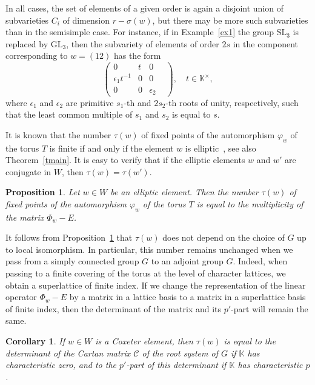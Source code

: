 \documentclass[a4paper,12pt]{amsart}
\theoremstyle{plain}
\newtheorem{proposition}{Proposition}
\newtheorem{corollary}{Corollary}
\theoremstyle{definition}
\newcommand{\KK}{\mathbb{K}}
\newcommand{\SL}{\mathrm{SL}}
\newcommand{\GL}{\mathrm{GL}}
\begin{document}
In all cases, the set of elements of a given order is again a disjoint union of subvarieties $C_i$ of dimension $r-\sigma(w)$, but there may be more such subvarieties than in the semisimple case. For instance, if in Example~\ref{ex1} the group $\SL_3$ is replaced by $\GL_3$, then the subvariety of elements of order $2s$ in the component corresponding to $w=(12)$ has the form
$$
\begin{pmatrix}
0 & t & 0 \\
\epsilon_1 t^{-1} & 0 & 0 & \\
0 & 0 & \epsilon_2
\end{pmatrix}, \quad t\in\KK^{\times},
$$
where $\epsilon_1$ and $\epsilon_2$ are primitive $s_1$-th and $2s_2$-th roots of unity, respectively, such that the least common multiple of $s_1$ and $s_2$ is equal to $s$.


It is known that the number $\tau(w)$ of fixed points of the automorphism $\varphi_w$ of the torus $T$ is finite if and only if the element $w$ is elliptic~\cite{Fe}, see also Theorem~\ref{tmain}. It is easy to verify that if the elliptic elements $w$ and $w'$ are conjugate in $W$, then $\tau(w)=\tau(w')$.

\begin{proposition}\label{fix}
Let $w\in W$ be an elliptic element. Then the number $\tau(w)$ of fixed points of the automorphism $\varphi_w$ of the torus $T$ is equal to the multiplicity of the matrix $\Phi_w-E$.
\end{proposition}

It follows from Proposition~\ref{fix} that $\tau(w)$ does not depend on the choice of $G$ up to local isomorphism. In particular, this number remains unchanged when we pass from a simply connected group $G$ to an adjoint group $G$. Indeed, when passing to a finite covering of the torus at the level of character lattices, we obtain a superlattice of finite index. If we change the representation of the linear operator $\Phi_w-E$ by a matrix in a lattice basis to a matrix in a superlattice basis of finite index, then the determinant of the matrix and its $p'$-part will remain the same.

\begin{corollary} \label{nb}
If $w\in W$ is a Coxeter element, then $\tau(w)$ is equal to the determinant of the Cartan matrix $\mathcal{C}$ of the root system of $G$ if $\KK$ has characteristic zero, and to the $p'$-part of this determinant if $\KK$ has characteristic $p$.
\end{corollary}
\end{document}
